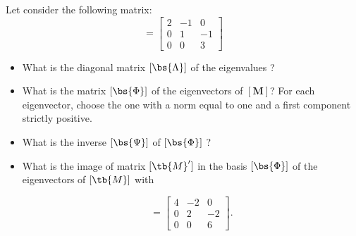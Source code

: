 \bexo
Let consider the following matrix:
\begin{equation}
[\tb{M}]=\left[
\begin{array}{ccc}
{2}&{-1}&{0}\\
{0}&{ 1}&{-1}\\
{0}&{ 0}&{3}
\end{array}	
\right]
\end{equation}
\begin{itemize}
	\item What is the diagonal matrix $[\bs{\Lambda}]$  of the eigenvalues ?
	\item What is the matrix $[\bs{\Phi}]$ of the eigenvectors of $[\textbf{M}]$? For each eigenvector, choose the one with a norm equal to one and a first component strictly positive.
	\item What is the inverse $[\bs{\Psi}]$ of $[\bs{\Phi}]$ ?  
	\item What is the image of matrix $[\tb{M}']$ in the basis $[\bs{\Phi}]$ of the eigenvectors of $[\tb{M}]$ with

\begin{equation}
[\tb{M}']=\left[
\begin{array}{ccc}
{4}&{-2}&{0}\\
{0}&{ 2}&{-2}\\
{0}&{ 0}&{6}
\end{array}	
\right].
\end{equation}	
\end{itemize}






